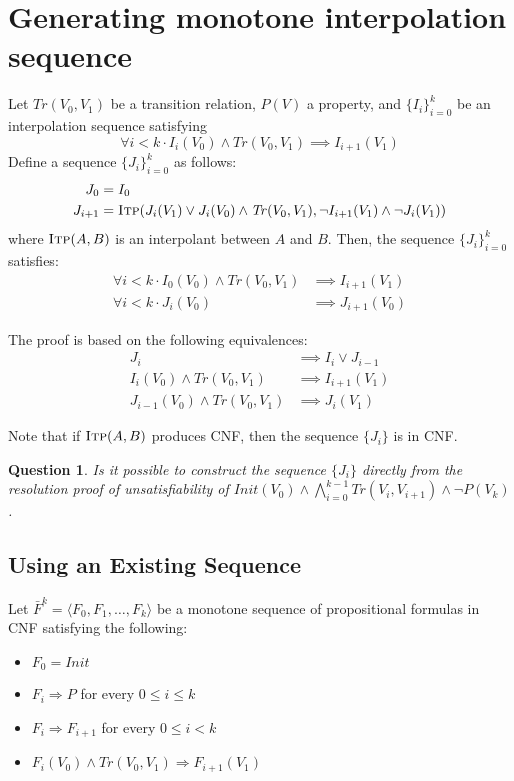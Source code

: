 \documentclass{article}
\newtheorem{question}{Question}
\newcommand{\itp}{\textsc{Itp}}
\newcommand{\Tr}{\mathit{Tr}}
\newcommand{\Init}{\mathit{Init}}
\newcommand{\setof}[1]{\{#1\}}
\begin{document}
\section{Generating monotone interpolation sequence}\label{monotone_itpseq}

Let $\Tr(V_0, V_1)$ be a transition relation, $P(V)$ a property, and $\setof{I_i}_{i=0}^k$ be
an interpolation sequence satisfying
\begin{equation}
  \forall i < k \cdot I_i(V_0) \land \Tr(V_0, V_1) \implies I_{i+1}(V_1)
\end{equation}
Define a sequence $\setof{J_i}_{i=0}^{k}$ as follows:
\begin{align}
  J_0 &= I_0\\
  J_{i+1} &= \itp (J_i(V_1) \lor J_i(V_0) \land \Tr(V_0,V_1),
  \neg I_{i+1}(V_1) \land \neg J_i(V_1))
\end{align}
where $\itp(A,B)$ is an interpolant between $A$ and $B$. Then, the
sequence $\setof{J_i}_{i=0}^k$ satisfies:
\begin{align}
  \forall i < k \cdot I_0(V_0) \land \Tr(V_0, V_1) &\implies
  I_{i+1}(V_1)\\
  \forall i < k \cdot J_i(V_0) &\implies J_{i+1}(V_0)
\end{align}

The proof is based on the following equivalences:
\begin{align}
  J_i &\implies I_i \lor J_{i-1}\\
  I_i(V_0) \land \Tr(V_0,V_1) &\implies I_{i+1}(V_1)\\
  J_{i-1}(V_0) \land \Tr(V_0,V_1) &\implies J_i(V_1)
\end{align}

Note that if $\itp(A,B)$ produces CNF, then the sequence $\setof{J_i}$ is in
CNF.

\begin{question} Is it possible to construct the sequence $\setof{J_i}$
  directly from the resolution proof of unsatisfiability of
  $\Init(V_0)\land\bigwedge_{i=0}^{k-1} \Tr(V_i,V_{i+1})\land\neg P(V_k)$.
\end{question}

\subsection{Using an Existing Sequence}

Let $\bar{F}^k = \langle F_0, F_1,\ldots, F_k\rangle$ be a monotone sequence of propositional formulas in CNF satisfying the following:
\begin{itemize}
	\item $F_0 = \Init$
	\item $F_i\Rightarrow P$ for every $0\leq i\leq k$
	\item $F_i \Rightarrow F_{i+1}$ for every $0\leq i < k$
	\item $F_i(V_0)\land\Tr(V_0,V_1)\Rightarrow F_{i+1}(V_1)$
\end{itemize}
\end{document}
